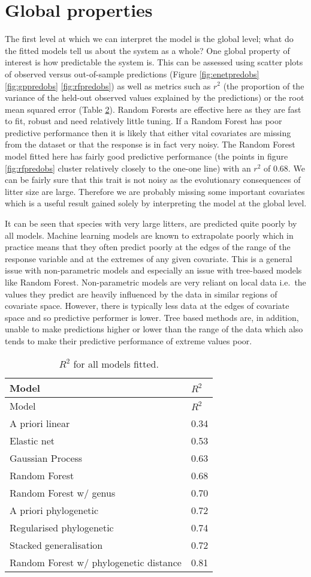 \documentclass[12pt,]{article}
\begin{document}
\section{Global properties}\label{global-properties}

The first level at which we can interpret the model is the global level; what do the fitted models tell us about the system as a whole?
One global property of interest is how predictable the system is.
This can be assessed using scatter plots of observed versus out-of-sample predictions (Figure \ref{fig:enetpredobs} \ref{fig:gppredobs} \ref{fig:rfpredobs}) as well as metrics such as  \(r^2\) (the proportion of the variance of the held-out observed values explained by the predictions) or the root mean squared error (Table \ref{tbl:allr2}).
Random Forests are effective here as they are fast to fit, robust and need relatively little tuning.
If a Random Forest has poor predictive performance then it is likely that either vital covariates are missing from the dataset or that the response is in fact very noisy.
The Random Forest model fitted here has fairly good predictive performance (the points in figure \ref{fig:rfpredobs} cluster relatively closely to the one-one line) with an \(r^2\) of 0.68.
We can be fairly sure that this trait is not noisy as the evolutionary consequences of litter size are large.
Therefore we are probably missing some important covariates which is a useful result gained solely by interpreting the model at the global level.

It can be seen that species with very large litters, are predicted quite poorly by all models.
Machine learning models are known to extrapolate poorly which in practice means that they often predict poorly at the edges of the range of the response variable and at the extremes of any given covariate.
This is a general issue with non-parametric models and especially an issue with tree-based models like Random Forest.
Non-parametric models are very reliant on local data i.e.~the values they predict are heavily influenced by the data in similar regions of covariate space.
However, there is typically less data at the edges of covariate space and so predictive performer is lower.
Tree based methods are, in addition, unable to make predictions higher or lower than the range of the data which also tends to make their predictive performance of extreme values poor.

\begin{table}[t!]
\begin{longtable}[c]{@{}ll@{}}
\caption{\(R^2\) for all models fitted. \label{tbl:allr2}}\tabularnewline
\toprule
Model & \(R^2\)\tabularnewline
\midrule
\endfirsthead
\toprule
Model & \(R^2\)\tabularnewline
\midrule
\endhead
A priori linear & 0.34\tabularnewline
Elastic net & 0.53\tabularnewline
Gaussian Process & 0.63\tabularnewline
Random Forest & 0.68\tabularnewline
Random Forest w/ genus & 0.70\tabularnewline
A priori phylogenetic & 0.72\tabularnewline
Regularised phylogenetic & 0.74\tabularnewline
Stacked generalisation & 0.72\tabularnewline
Random Forest w/ phylogenetic distance & 0.81\tabularnewline
\bottomrule
\end{longtable}
\end{table}
\end{document}
